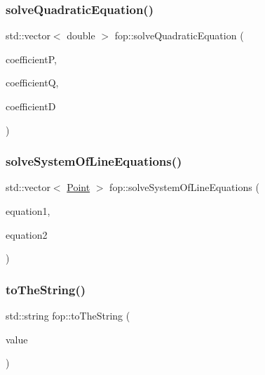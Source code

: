 \subsubsection{\texorpdfstring{solve\+Quadratic\+Equation()}{solveQuadraticEquation()}}
{\footnotesize\ttfamily std\+::vector$<$ double $>$ fop\+::solve\+Quadratic\+Equation (\begin{DoxyParamCaption}\item[{double}]{coefficientP,  }\item[{double}]{coefficientQ,  }\item[{double}]{coefficientD }\end{DoxyParamCaption})}

\mbox{\label{namespacefop_a231b2b83dca5c216ecd24bea0f918e87}} 
\subsubsection{\texorpdfstring{solve\+System\+Of\+Line\+Equations()}{solveSystemOfLineEquations()}}
{\footnotesize\ttfamily std\+::vector$<$ \mbox{\hyperlink{structtdp_1_1_point}{Point}} $>$ fop\+::solve\+System\+Of\+Line\+Equations (\begin{DoxyParamCaption}\item[{\mbox{\hyperlink{structfop_1_1_equation}{Equation}}}]{equation1,  }\item[{\mbox{\hyperlink{structfop_1_1_equation}{Equation}}}]{equation2 }\end{DoxyParamCaption})}

\mbox{\label{namespacefop_a4cb96232c3e9d082f2c48a97a35e2454}} 
\subsubsection{\texorpdfstring{to\+The\+String()}{toTheString()}\hspace{0.1cm}{\footnotesize\ttfamily [1/2]}}
{\footnotesize\ttfamily std\+::string fop\+::to\+The\+String (\begin{DoxyParamCaption}\item[{\mbox{\hyperlink{namespacefop_a60dafe2e1ac5bb402dad57ecacde23d5}{Figures\+Type}}}]{value }\end{DoxyParamCaption})}

